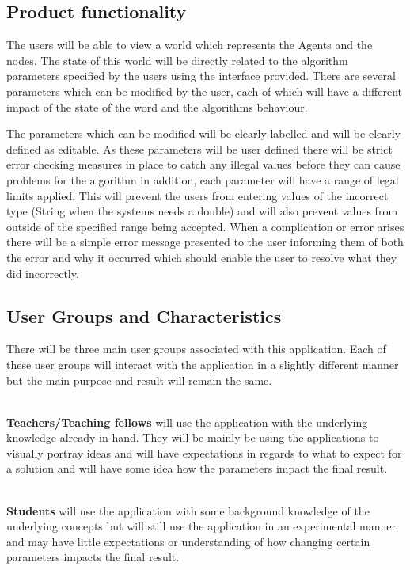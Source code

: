 \subsection{Product functionality}

The users will be able to view a world which represents the Agents and the nodes. The state of this world will be directly related to the algorithm parameters specified by the users using the interface provided. There are several parameters which can be modified by the user, each of which will have a different impact of the state of the word and the algorithms behaviour.

The parameters which can be modified will be clearly labelled and will be clearly defined as editable. As these parameters will be user defined there will be strict error checking measures in place to catch any illegal values before they can cause problems for the algorithm in addition, each parameter will have a range of legal limits applied. This will prevent the users from entering values of the incorrect type (String when the systems needs a double) and will also prevent values from outside of the specified range being accepted. When a complication or error arises there will be a simple error message presented to the user informing them of both the error and why it occurred which should enable the user to resolve what they did incorrectly.

\subsection{User Groups and Characteristics}
\label{ssec:usergroups}
There will be three main user groups associated with this application. Each of these user groups will interact with the application in a slightly different manner but the main purpose and result will remain the same.

\noindent \\
\textbf{Teachers/Teaching fellows} will use the application with the underlying knowledge already in hand. They will be mainly be using the applications to visually portray ideas and will have expectations in regards to what to expect for a solution and will have some idea how the parameters impact the final result.

\noindent \\
\textbf{Students} will use the application with some background knowledge of the underlying concepts but will still use the application in an experimental manner and may have little expectations or understanding of how changing certain parameters impacts the final result. 

